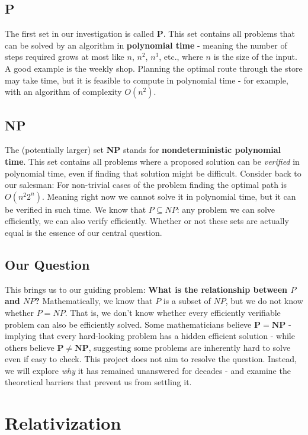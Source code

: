 \documentclass[12pt]{report}
\begin{document}
\section{P}
The first set in our investigation is called \textbf{P}.
This set contains all problems that can be solved by an algorithm in \textbf{polynomial time} - meaning the number of steps required grows at most like $n$, $n^2$, $n^3$, etc., where $n$ is the size of the input.
A good example is the weekly shop.
Planning the optimal route through the store may take time, but it is feasible to compute in polynomial time - for example, with an algorithm of complexity $O(n^2)$.

\section{NP}
The (potentially larger) set \textbf{NP} stands for \textbf{nondeterministic polynomial time}. This set contains all problems where a proposed solution can be \textit{verified} in polynomial time, even if finding that solution might be difficult.
Consider back to our salesman: For non-trivial cases of the problem finding the optimal path is \( O(n^2 2^n) \).
Meaning right now we cannot solve it in polynomial time, but it can be verified in such time.
We know that $P \subseteq NP$: any problem we can solve efficiently, we can also verify efficiently.
Whether or not these sets are actually equal is the essence of our central question.

\section{Our Question}
This brings us to our guiding problem: \textbf{What is the relationship between $P$ and $NP$?}
Mathematically, we know that $P$ is a subset of $NP$, but we do not know whether $P = NP$. That is, we don't know whether every efficiently verifiable problem can also be efficiently solved.
Some mathematicians believe $\mathbf{P = NP}$ - implying that every hard-looking problem has a hidden efficient solution - while others believe $\mathbf{P \neq NP}$, suggesting some problems are inherently hard to solve even if easy to check.
This project does not aim to resolve the question. Instead, we will explore \textit{why} it has remained unanswered for decades - and examine the theoretical barriers that prevent us from settling it.


\newpage
\chapter{Relativization}
\end{document}
